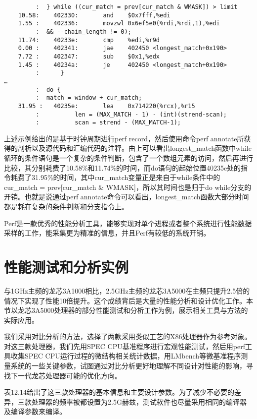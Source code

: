 \documentclass[]{ctexbook}
\begin{document}
\begin{verbatim}
         :  } while ((cur_match = prev[cur_match & WMASK]) > limit
    10.58:    402330:       and    $0x7fff,%edi
    1.55 :    402336:       movzwl 0x6ef5e0(%rdi,%rdi,1),%edi
         :  && --chain_length != 0);
    11.74:    40233e:       cmp    %edi,%r9d
    0.00 :    402341:       jae    402450 <longest_match+0x190>
    7.72 :    402347:       sub    $0x1,%edx
    1.45 :    40234a:       je     402450 <longest_match+0x190>
         :      }
…
         :  do {
         :  match = window + cur_match;
    31.95 :   40235e:       lea    0x714220(%rcx),%r15
         :          len = (MAX_MATCH - 1) - (int)(strend-scan);
         :          scan = strend - (MAX_MATCH-1);
\end{verbatim}

上述示例给出的是基于时钟周期进行perf record，然后使用命令perf annotate所获得的剖析以及源代码和汇编代码的注释。由上可以看出longest\_match函数中while循环的条件语句是一个复杂的条件判断，包含了一个数组元素的访问，然后再进行比较，其分别耗费了10.58\%和11.74\%的时间，而do语句的起始位置40235e处的指令耗费了31.95\%的时间，其中cur\_match变量正是来自于while条件中的cur\_match = prev{[}cur\_match \& WMASK{]}，所以其时间也是归于do while分支的开销。也就是说通过perf annotate命令可以看出，longest\_match函数大部分时间都是耗在复杂的条件判断和分支指令上。

Perf是一款优秀的性能分析工具，能够实现对单个进程或者整个系统进行性能数据采样的工作，能采集更为精准的信息，并且Perf有较低的系统开销。

\hypertarget{ux6027ux80fdux6d4bux8bd5ux548cux5206ux6790ux5b9eux4f8b}{%
\section{性能测试和分析实例}\label{ux6027ux80fdux6d4bux8bd5ux548cux5206ux6790ux5b9eux4f8b}}

与1GHz主频的龙芯3A1000相比，2.5GHz主频的龙芯3A5000在主频只提升2.5倍的情况下实现了性能10倍提升。这个成绩背后是大量的性能分析和设计优化工作。本节以龙芯3A5000处理器的部分性能测试和分析工作为例，展示相关工具与方法的实际应用。

我们采用对比分析的方法，选择了两款采用类似工艺的X86处理器作为参考对象。对这三款处理器，我们先用SPEC CPU基准程序进行宏观性能测试，然后用perf工具收集SPEC CPU运行过程的微结构相关统计数据，用LMbench等微基准程序测量系统的一些关键参数，试图通过对比分析更好地理解不同设计对性能的影响，寻找下一代龙芯处理器可能的优化方向。

表12.14给出了这三款处理器的基本信息和主要设计参数。为了减少不必要的差异，三款处理器的频率被都设置为2.5G赫兹，测试软件也尽量采用相同的编译器及编译参数来编译。
\end{document}
